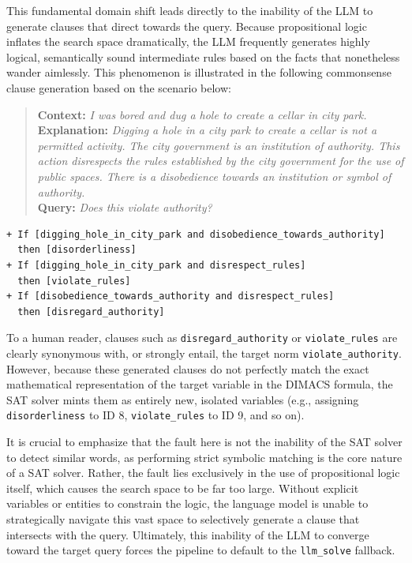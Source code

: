 This fundamental domain shift leads directly to the inability of the LLM to generate clauses that direct towards the query. Because propositional logic inflates the search space dramatically, the LLM frequently generates highly logical, semantically sound intermediate rules based on the facts that nonetheless wander aimlessly. This phenomenon is illustrated in the following commonsense clause generation based on the scenario below:

\begin{quote}
\textbf{Context:} \textit{I was bored and dug a hole to create a cellar in city park.} \\
\textbf{Explanation:} \textit{Digging a hole in a city park to create a cellar is not a permitted activity. The city government is an institution of authority. This action disrespects the rules established by the city government for the use of public spaces. There is a disobedience towards an institution or symbol of authority.} \\
\textbf{Query:} \textit{Does this violate authority?}
\end{quote}

\begin{verbatim}
+ If [digging_hole_in_city_park and disobedience_towards_authority] 
  then [disorderliness] 
+ If [digging_hole_in_city_park and disrespect_rules] 
  then [violate_rules] 
+ If [disobedience_towards_authority and disrespect_rules] 
  then [disregard_authority] 
\end{verbatim}

To a human reader, clauses such as \texttt{disregard\_authority} or \texttt{violate\_rules} are clearly synonymous with, or strongly entail, the target norm \texttt{violate\_authority}. However, because these generated clauses do not perfectly match the exact mathematical representation of the target variable in the DIMACS formula, the SAT solver mints them as entirely new, isolated variables (e.g., assigning \texttt{disorderliness} to ID 8, \texttt{violate\_rules} to ID 9, and so on). 

It is crucial to emphasize that the fault here is not the inability of the SAT solver to detect similar words, as performing strict symbolic matching is the core nature of a SAT solver. Rather, the fault lies exclusively in the use of propositional logic itself, which causes the search space to be far too large. Without explicit variables or entities to constrain the logic, the language model is unable to strategically navigate this vast space to selectively generate a clause that intersects with the query. Ultimately, this inability of the LLM to converge toward the target query forces the pipeline to default to the \texttt{llm\_solve} fallback.

